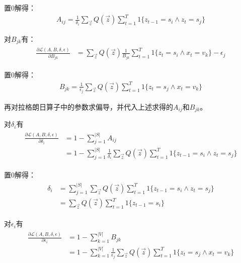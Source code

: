 置0解得：
\begin{align}
\label{eqn:hmm-a-answer}
A_{ij} =\frac{1}{\delta_{i}} \sum_{\vec{z}}Q(\vec{z})\sum_{t=1}^{T}1\{z_{t-1}=s_i\wedge{z_t=s_j}\}
\end{align}  

对$B_{jk}$有：
\begin{align}
\label{eqn:hmm-b}
\begin{split}
\frac{\partial\mathcal{L}(A,B,\delta,\epsilon)}{\partial B_{jk}} &=\sum_{\vec{z}}Q(\vec{z})\frac{1}{B_{jk}}\sum_{t=1}^{T}1\{z_{t}=s_i\wedge{x_t=v_k}\} - \epsilon_{j} 
\end{split}
\end{align}  

置0解得：
\begin{align}
\label{eqn:hmm-b-answer}
B_{jk} =\frac{1}{\epsilon_{j}} \sum_{\vec{z}}Q(\vec{z})\sum_{t=1}^{T}1\{z_{t}=s_j\wedge{x_t=v_k}\}
\end{align}  

再对拉格朗日算子中的参数求偏导，并代入上述求得的$A_{ij}$和$B_{jk}$。

对$\delta_{i}$有
\begin{align}
\label{eqn:hmm-delta}
\begin{split}
\frac{\partial\mathcal{L}(A,B,\delta,\epsilon)}{\partial \delta_{i}} 
        &= 1-\sum_{j=1}^{|S|} A_{ij}  \\
        &= 1-\sum_{j=1}^{|S|} \frac{1}{\delta_{i}} \sum_{\vec{z}}Q(\vec{z})\sum_{t=1}^{T}1\{z_{t-1}=s_i\wedge{z_t=s_j}\}
\end{split}
\end{align}  

置0解得：
\begin{align}
\label{eqn:hmm-delta-answer}
\begin{split}
\delta_{i} &= \sum_{j=1}^{|S|} \sum_{\vec{z}}Q(\vec{z})\sum_{t=1}^{T}1\{z_{t-1}=s_i\wedge{z_t=s_j}\} \\
           &= \sum_{\vec{z}}Q(\vec{z})\sum_{t=1}^{T}1\{z_{t-1}=s_i\}
\end{split}
\end{align} 

对$\epsilon_{i}$有
\begin{align}
\label{eqn:hmm-epsilon}
\begin{split}
\frac{\partial\mathcal{L}(A,B,\delta,\epsilon)}{\partial \epsilon_{i}} 
        &= 1-\sum_{k=1}^{|V|} B_{jk}  \\
        &= 1-\sum_{k=1}^{|V|} \frac{1}{\epsilon_{j}} \sum_{\vec{z}}Q(\vec{z})\sum_{t=1}^{T}1\{z_{t}=s_j\wedge{x_t=v_k}\}
\end{split}
\end{align}  

